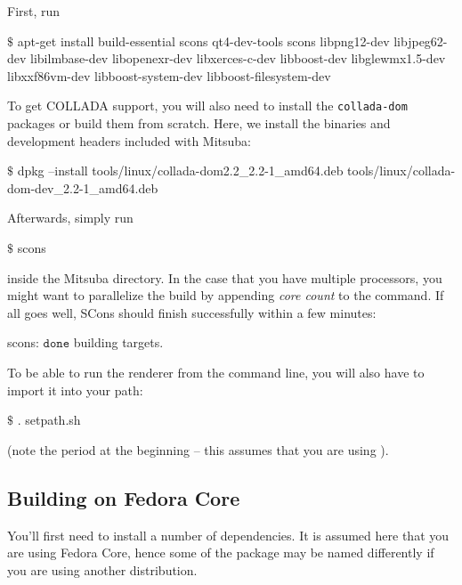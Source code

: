 First, run
\begin{shell}
$\text{\$}$ apt-get install build-essential scons qt4-dev-tools scons libpng12-dev libjpeg62-dev libilmbase-dev libopenexr-dev libxerces-c-dev libboost-dev libglewmx1.5-dev libxxf86vm-dev libboost-system-dev libboost-filesystem-dev
\end{shell}
To get COLLADA support, you will also need to install the \texttt{collada-dom} packages or build them from scratch. Here, we install the  binaries and development headers included with Mitsuba:
\begin{shell}
$\text{\$}$ dpkg --install tools/linux/collada-dom2.2_2.2-1_amd64.deb tools/linux/collada-dom-dev_2.2-1_amd64.deb
\end{shell}
Afterwards, simply run
\begin{shell}
$\text{\$}$ scons
\end{shell}
inside the Mitsuba directory. In the case that you have multiple processors, you might want to parallelize the build by appending \emph{core count} to the command.
If all goes well, SCons should finish successfully within a few minutes:
\begin{shell}
scons: $\texttt{done}$ building targets.
\end{shell}
To be able to run the renderer from the command line, you will also have to import it into your path:
\begin{shell}
$\text{\$}$ . setpath.sh
\end{shell}
(note the period at the beginning -- this assumes that you are using ).

\subsection{Building on Fedora Core}
You'll first need to install a number of dependencies. It is assumed here
that you are using Fedora Core, hence some of the package may be named differently if you are 
using another distribution.

